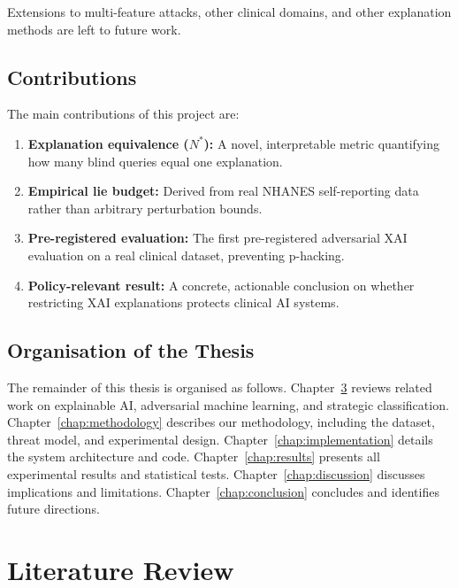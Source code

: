 \documentclass[12pt, a4paper, oneside]{report}
\theoremstyle{definition}
\begin{document}
Extensions to multi-feature attacks, other clinical domains, and other
explanation methods are left to future work.

\section{Contributions}

The main contributions of this project are:
\begin{enumerate}
  \item \textbf{Explanation equivalence ($N^*$):} A novel, interpretable metric
        quantifying how many blind queries equal one explanation.
  \item \textbf{Empirical lie budget:} Derived from real NHANES self-reporting
        data rather than arbitrary perturbation bounds.
  \item \textbf{Pre-registered evaluation:} The first pre-registered adversarial
        XAI evaluation on a real clinical dataset, preventing p-hacking.
  \item \textbf{Policy-relevant result:} A concrete, actionable conclusion on
        whether restricting XAI explanations protects clinical AI systems.
\end{enumerate}

\section{Organisation of the Thesis}

The remainder of this thesis is organised as follows. Chapter~\ref{chap:litreview}
reviews related work on explainable AI, adversarial machine learning, and
strategic classification. Chapter~\ref{chap:methodology} describes our
methodology, including the dataset, threat model, and experimental design.
Chapter~\ref{chap:implementation} details the system architecture and code.
Chapter~\ref{chap:results} presents all experimental results and statistical
tests. Chapter~\ref{chap:discussion} discusses implications and limitations.
Chapter~\ref{chap:conclusion} concludes and identifies future directions.

\chapter{Literature Review}
\label{chap:litreview}
\end{document}
